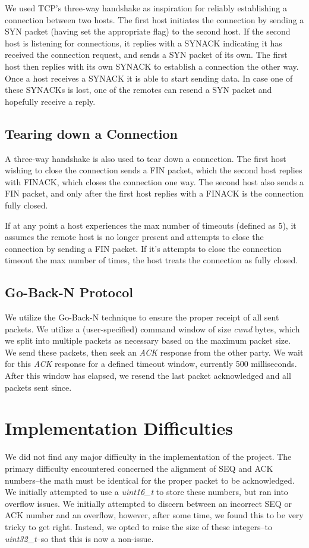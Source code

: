 \documentclass[12pt]{article}
\begin{document}
We used TCP's three-way handshake as inspiration for reliably establishing a connection between two hosts. The first host initiates the connection by sending a SYN packet (having set the appropriate flag) to the second host. If the second host is listening for connections, it replies with a SYNACK indicating it has received the connection request, and sends a SYN packet of its own. The first host then replies with its own SYNACK to establish a connection the other way. Once a host receives a SYNACK it is able to start sending data. In case one of these SYNACKs is lost, one of the remotes can resend a SYN packet and hopefully receive a reply.

\subsection{Tearing down a Connection}

A three-way handshake is also used to tear down a connection. The first host wishing to close the connection sends a FIN packet, which the second host replies with FINACK, which closes the connection one way. The second host also sends a FIN packet, and only after the first host replies with a FINACK is the connection fully closed.

If at any point a host experiences the max number of timeouts (defined as 5), it assumes the remote host is no longer present and attempts to close the connection by sending a FIN packet. If it's attempts to close the connection timeout the max number of times, the host treats the connection as fully closed.

\subsection{Go-Back-N Protocol}

We utilize the Go-Back-N technique to ensure the proper receipt of all sent packets. We utilize a (user-specified) command window of size \emph{cwnd} bytes, which we split into multiple packets as necessary based on the maximum packet size. We send these packets, then seek an \emph{ACK} response from the other party. We wait for this \emph{ACK} response for a defined timeout window, currently 500 milliseconds. After this window has elapsed, we resend the last packet acknowledged and all packets sent since.

\section{Implementation Difficulties}
We did not find any major difficulty in the implementation of the project. The primary difficulty encountered concerned the alignment of SEQ and ACK numbers--the math must be identical for the proper packet to be acknowledged. We initially attempted to use a \emph{uint16\_t} to store these numbers, but ran into overflow issues. We initially attempted to discern between an incorrect SEQ or ACK number and an overflow, however, after some time, we found this to be very tricky to get right. Instead, we opted to raise the size of these integers--to \emph{uint32\_t}--so that this is now a non-issue.
\end{document}
